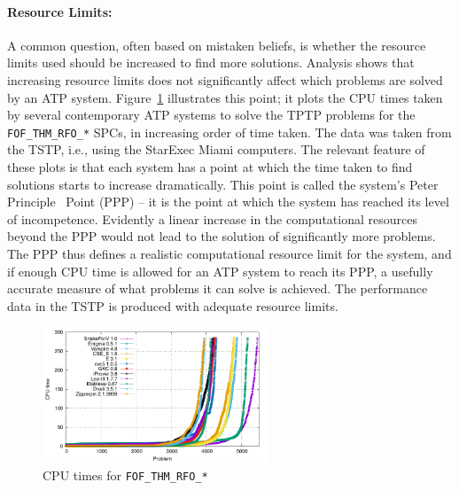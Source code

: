\documentclass{easychair}
\begin{document}
\paragraph{Resource Limits:}
A common question, often based on mistaken beliefs, is whether the resource limits used should 
be increased to find more solutions.
Analysis shows that increasing resource limits does not significantly affect which problems 
are solved by an ATP system. 
Figure~\ref{PPPPlot} illustrates this point; it plots the CPU times taken by several contemporary 
ATP systems to solve the TPTP problems for the {\tt FOF\_THM\_RFO\_*} SPCs, in increasing order 
of time taken. 
The data was taken from the TSTP, i.e., using the StarExec Miami computers.
The relevant feature of these plots is that each system has a point at which the time taken to 
find solutions starts to increase dramatically. 
This point is called the system's Peter Principle~\cite{PH69} Point (PPP) -- it is the point at 
which the system has reached its level of incompetence. 
Evidently a linear increase in the computational resources beyond the PPP would not lead to the 
solution of significantly more problems. 
The PPP thus defines a realistic computational resource limit for the system, and if enough CPU 
time is allowed for an ATP system to reach its PPP, a usefully accurate measure of what problems 
it can solve is achieved.
The performance data in the TSTP is produced with adequate resource limits.

\begin{figure}[htb]
\centering
\includegraphics[width=0.6\textwidth]{FOF_THM_RFO_PPP.pdf}
\vspace*{-1em}
\caption{CPU times for {\tt FOF\_THM\_RFO\_*}}
\label{PPPPlot}
\end{figure}
\end{document}
